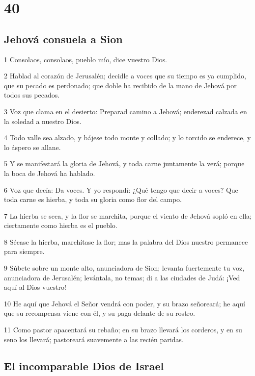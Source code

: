 \chapter{40}

\section*{Jehová consuela a Sion}

\par 1 Consolaos, consolaos, pueblo mío, dice vuestro Dios.
\par 2 Hablad al corazón de Jerusalén; decidle a voces que su tiempo es ya cumplido, que su pecado es perdonado; que doble ha recibido de la mano de Jehová por todos sus pecados.
\par 3 Voz que clama en el desierto: Preparad camino a Jehová; enderezad calzada en la soledad a nuestro Dios. 
\par 4 Todo valle sea alzado, y bájese todo monte y collado; y lo torcido se enderece, y lo áspero se allane.
\par 5 Y se manifestará la gloria de Jehová, y toda carne juntamente la verá; porque la boca de Jehová ha hablado. 
\par 6 Voz que decía: Da voces. Y yo respondí: ¿Qué tengo que decir a voces? Que toda carne es hierba, y toda su gloria como flor del campo.
\par 7 La hierba se seca, y la flor se marchita, porque el viento de Jehová sopló en ella; ciertamente como hierba es el pueblo.
\par 8 Sécase la hierba, marchítase la flor; mas la palabra del Dios nuestro permanece para siempre. 
\par 9 Súbete sobre un monte alto, anunciadora de Sion; levanta fuertemente tu voz, anunciadora de Jerusalén; levántala, no temas; di a las ciudades de Judá: ¡Ved aquí al Dios vuestro!
\par 10 He aquí que Jehová el Señor vendrá con poder, y su brazo señoreará; he aquí que su recompensa viene con él, y su paga delante de su rostro. 
\par 11 Como pastor apacentará su rebaño; en su brazo llevará los corderos, y en su seno los llevará; pastoreará suavemente a las recién paridas.

\section*{El incomparable Dios de Israel}

